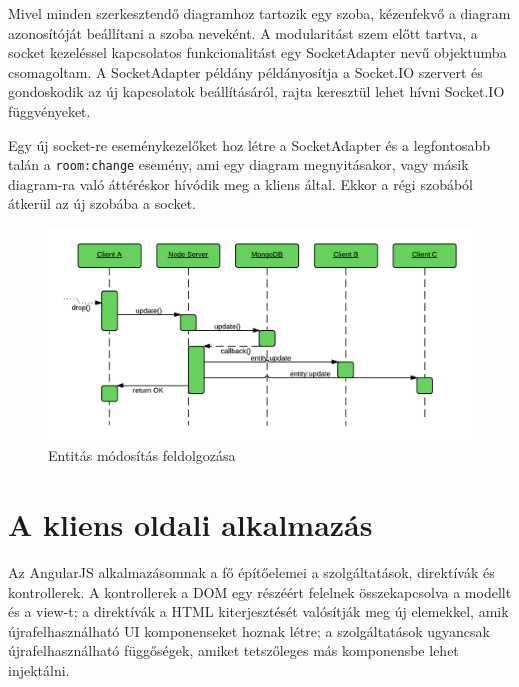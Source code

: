 Mivel minden szerkesztendő diagramhoz tartozik egy szoba, kézenfekvő a diagram azonosítóját beállítani a szoba neveként. A modularitást szem előtt tartva, a socket kezeléssel kapcsolatos funkcionalitást egy SocketAdapter nevű objektumba csomagoltam. A SocketAdapter példány példányosítja a Socket.IO szervert és gondoskodik az új kapcsolatok beállításáról, rajta keresztül lehet hívni Socket.IO függvényeket.

Egy új socket-re eseménykezelőket hoz létre a SocketAdapter és a legfontosabb talán a \lstinline{room:change} esemény, ami egy diagram megnyitásakor, vagy másik diagram-ra való áttéréskor hívódik meg a kliens által. Ekkor a régi szobából átkerül az új szobába a socket. 

\begin{figure}[!ht]
\centering
\includegraphics[width=15cm,keepaspectratio]{figures/collaboration-seq.png}
\caption{Entitás módosítás feldolgozása}
\label{fig:angularhtml}
\end{figure}




\section{A kliens oldali alkalmazás}



Az AngularJS alkalmazásomnak a fő építőelemei a szolgáltatások, direktívák és kontrollerek. A kontrollerek a DOM egy részéért felelnek összekapcsolva a modellt és a view-t; a direktívák a HTML kiterjesztését valósítják meg új elemekkel, amik újrafelhasználható UI komponenseket hoznak létre; a szolgáltatások ugyancsak újrafelhasználható függőségek, amiket tetszőleges más komponensbe lehet injektálni.


